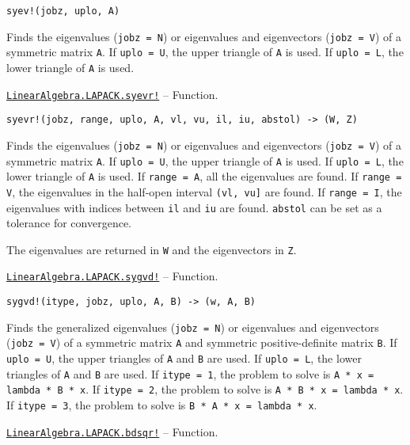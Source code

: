 \begin{adjustwidth}{2em}{0pt}


\begin{verbatim}
syev!(jobz, uplo, A)
\end{verbatim}

Finds the eigenvalues (\texttt{jobz = N}) or eigenvalues and eigenvectors (\texttt{jobz = V}) of a symmetric matrix \texttt{A}. If \texttt{uplo = U}, the upper triangle of \texttt{A} is used. If \texttt{uplo = L}, the lower triangle of \texttt{A} is used.



\end{adjustwidth}
\hypertarget{9325824410810690137}{} 
\hyperlink{9325824410810690137}{\texttt{LinearAlgebra.LAPACK.syevr!}}  -- {Function.}

\begin{adjustwidth}{2em}{0pt}


\begin{verbatim}
syevr!(jobz, range, uplo, A, vl, vu, il, iu, abstol) -> (W, Z)
\end{verbatim}

Finds the eigenvalues (\texttt{jobz = N}) or eigenvalues and eigenvectors (\texttt{jobz = V}) of a symmetric matrix \texttt{A}. If \texttt{uplo = U}, the upper triangle of \texttt{A} is used. If \texttt{uplo = L}, the lower triangle of \texttt{A} is used. If \texttt{range = A}, all the eigenvalues are found. If \texttt{range = V}, the eigenvalues in the half-open interval \texttt{(vl, vu]} are found. If \texttt{range = I}, the eigenvalues with indices between \texttt{il} and \texttt{iu} are found. \texttt{abstol} can be set as a tolerance for convergence.

The eigenvalues are returned in \texttt{W} and the eigenvectors in \texttt{Z}.



\end{adjustwidth}
\hypertarget{8632196472915375761}{} 
\hyperlink{8632196472915375761}{\texttt{LinearAlgebra.LAPACK.sygvd!}}  -- {Function.}

\begin{adjustwidth}{2em}{0pt}


\begin{verbatim}
sygvd!(itype, jobz, uplo, A, B) -> (w, A, B)
\end{verbatim}

Finds the generalized eigenvalues (\texttt{jobz = N}) or eigenvalues and eigenvectors (\texttt{jobz = V}) of a symmetric matrix \texttt{A} and symmetric positive-definite matrix \texttt{B}. If \texttt{uplo = U}, the upper triangles of \texttt{A} and \texttt{B} are used. If \texttt{uplo = L}, the lower triangles of \texttt{A} and \texttt{B} are used. If \texttt{itype = 1}, the problem to solve is \texttt{A * x = lambda * B * x}. If \texttt{itype = 2}, the problem to solve is \texttt{A * B * x = lambda * x}. If \texttt{itype = 3}, the problem to solve is \texttt{B * A * x = lambda * x}.



\end{adjustwidth}
\hypertarget{13657736097940764011}{} 
\hyperlink{13657736097940764011}{\texttt{LinearAlgebra.LAPACK.bdsqr!}}  -- {Function.}

